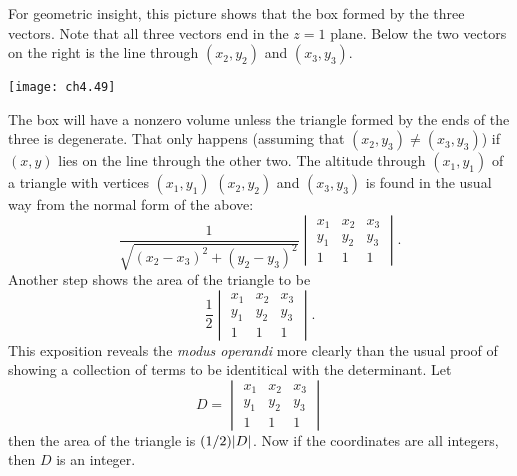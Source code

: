 \begin{exercises}
\begin{answer}
\begin{exparts}
        For geometric insight, this 
        picture shows that the box formed by the three vectors.
        Note that all 
        three vectors end in the $z=1$ plane.
        Below the two vectors on the right is the line through
        $(x_2,y_2)$ and $(x_3,y_3)$.
        \begin{center}
          \texttt{[image: ch4.49]}
        \end{center}
        The box will 
        have a nonzero volume unless the triangle formed by the ends of the
        three is degenerate.
        That only happens (assuming that $(x_2,y_3)\neq (x_3,y_3)$)
        if  $(x,y)$ lies on the line through the other two. 
       \partsitem \answerasgiven %
        The altitude through $(x_1,y_1)$ of a triangle with vertices
        $(x_1,y_1)$ $(x_2,y_2)$ and $(x_3,y_3)$ is found in the usual
        way from the normal form of the above:
        \begin{equation*}
          \frac{1}{\sqrt{(x_2-x_3)^2+(y_2-y_3)^2}}
          \begin{vmatrix}
            x_1  &x_2  &x_3  \\
            y_1  &y_2  &y_3  \\
            1    &1    &1
          \end{vmatrix}.
        \end{equation*}
        Another step shows the area of the triangle to be
        \begin{equation*}
          \frac{1}{2}
          \begin{vmatrix}
            x_1  &x_2  &x_3  \\
            y_1  &y_2  &y_3  \\
            1    &1    &1
          \end{vmatrix}.
        \end{equation*}
        This exposition reveals the \textit{modus operandi} more clearly
        than the usual proof of showing a collection of terms to be identitical
        with the determinant.
       \partsitem  \answerasgiven %
        Let
        \begin{equation*}
          D=
          \begin{vmatrix}
            x_1  &x_2  &x_3  \\
            y_1  &y_2  &y_3  \\
            1    &1    &1
          \end{vmatrix}
        \end{equation*}
        then the area of the triangle is $(1/2)\deter{D}$.
        Now if the coordinates are all integers, then $D$ is an integer.
      \end{exparts}
    \end{answer}
\end{exercises}
